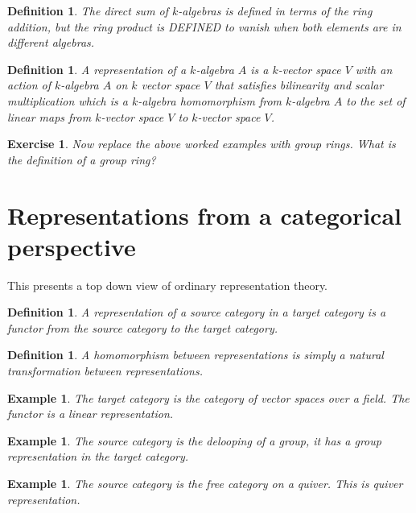 \documentclass{tufte-book}
\newtheorem{definition}[theorem]{Definition}
\newtheorem{example}[theorem]{Example}
\newtheorem{exercise}[theorem]{Exercise}
\begin{document}
\begin{definition}
	The direct sum of $k$-algebras is defined in terms of the ring addition, but the ring product is DEFINED to vanish when both elements are in different algebras.
\end{definition}

\begin{definition}
	A representation of a $k$-algebra $A$ is a $k$-vector space $V$ with an action of $k$-algebra $A$ on $k$ vector space $V$ that satisfies bilinearity and scalar multiplication which is a $k$-algebra homomorphism from $k$-algebra $A$ to the set of linear maps from $k$-vector space $V$ to $k$-vector space $V$.
\end{definition}

\begin{exercise}
	Now replace the above worked examples with group rings. What is the definition of a group ring?
\end{exercise}

\section{Representations from a categorical perspective}

This presents a top down view of ordinary representation theory.

\begin{definition}
	A representation of a source category in a target category is a functor from the source category to the target category.
\end{definition}

\begin{definition}
	A homomorphism between representations is simply a natural transformation between representations.
\end{definition}

\begin{example}
	The target category is the category of vector spaces over a field. The functor is a linear representation.
\end{example}

\begin{example}
	The source category is the delooping of a group, it has a group representation in the target category.
\end{example}

\begin{example}
	The source category is the free category on a quiver. This is quiver representation.
\end{example}
\end{document}
